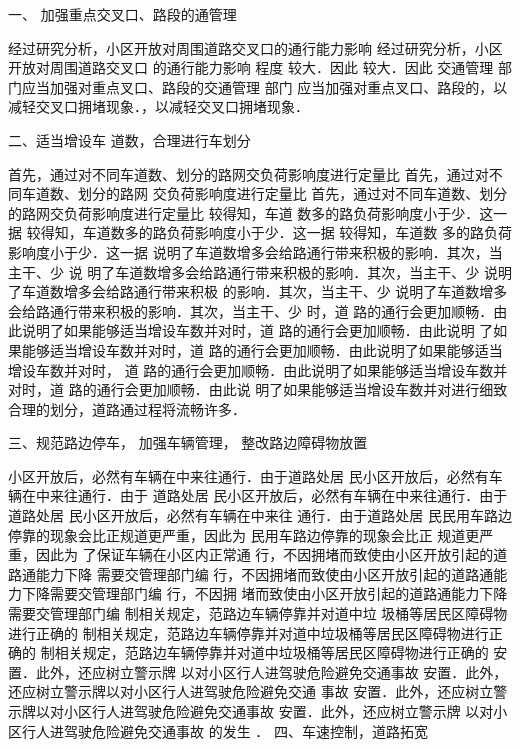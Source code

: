 一、 加强重点交叉口、路段的通管理

经过研究分析，小区开放对周围道路交叉口的通行能力影响 经过研究分析，小区开放对周围道路交叉口
的通行能力影响 程度 较大．因此 较大．因此 交通管理 部门应当加强对重点叉口、路段的交通管理 部门
应当加强对重点叉口、路段的，以减轻交叉口拥堵现象．，以减轻交叉口拥堵现象．

二、适当增设车 道数，合理进行车划分

首先，通过对不同车道数、划分的路网交负荷影响度进行定量比 首先，通过对不同车道数、划分的路网
交负荷影响度进行定量比 首先，通过对不同车道数、划分的路网交负荷影响度进行定量比 较得知，车道
数多的路负荷影响度小于少．这一据 较得知，车道数多的路负荷影响度小于少．这一据 较得知，车道数
多的路负荷影响度小于少．这一据 说明了车道数增多会给路通行带来积极的影响．其次，当主干、少 说
明了车道数增多会给路通行带来积极的影响．其次，当主干、少 说明了车道数增多会给路通行带来积极
的影响．其次，当主干、少 说明了车道数增多会给路通行带来积极的影响．其次，当主干、少 时，道
路的通行会更加顺畅．由此说明了如果能够适当增设车数并对时，道 路的通行会更加顺畅．由此说明
了如果能够适当增设车数并对时，道 路的通行会更加顺畅．由此说明了如果能够适当增设车数并对时，
道 路的通行会更加顺畅．由此说明了如果能够适当增设车数并对时，道 路的通行会更加顺畅．由此说
明了如果能够适当增设车数并对进行细致合理的划分，道路通过程将流畅许多．

三、规范路边停车， 加强车辆管理， 整改路边障碍物放置

小区开放后，必然有车辆在中来往通行．由于道路处居 民小区开放后，必然有车辆在中来往通行．由于
道路处居 民小区开放后，必然有车辆在中来往通行．由于道路处居 民小区开放后，必然有车辆在中来往
通行．由于道路处居 民民用车路边停靠的现象会比正规道更严重，因此为 民用车路边停靠的现象会比正
规道更严重，因此为 了保证车辆在小区内正常通 行，不因拥堵而致使由小区开放引起的道路通能力下降
需要交管理部门编 行，不因拥堵而致使由小区开放引起的道路通能力下降需要交管理部门编 行，不因拥
堵而致使由小区开放引起的道路通能力下降需要交管理部门编 制相关规定，范路边车辆停靠并对道中垃
圾桶等居民区障碍物进行正确的 制相关规定，范路边车辆停靠并对道中垃圾桶等居民区障碍物进行正确的
 制相关规定，范路边车辆停靠并对道中垃圾桶等居民区障碍物进行正确的 安置．此外，还应树立警示牌
 以对小区行人进驾驶危险避免交通事故 安置．此外，还应树立警示牌以对小区行人进驾驶危险避免交通
 事故 安置．此外，还应树立警示牌以对小区行人进驾驶危险避免交通事故 安置．此外，还应树立警示牌
 以对小区行人进驾驶危险避免交通事故 的发生
．
四、车速控制，道路拓宽


